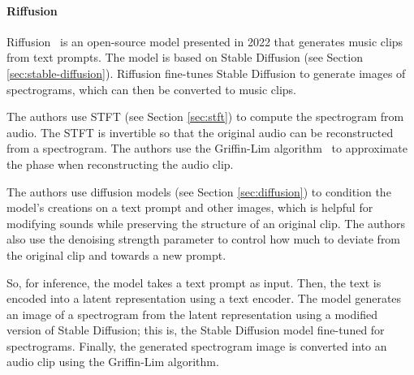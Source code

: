 \paragraph{Riffusion} \label{sec:riffusion}

Riffusion~\cite{forsgren_riffusion_2022} is an open-source model presented in 2022 that generates music clips from text prompts. The model is based on Stable Diffusion (see Section \ref{sec:stable-diffusion}). Riffusion fine-tunes Stable Diffusion to generate images of spectrograms, which can then be converted to music clips.

The authors use \ac{STFT} (see Section \ref{sec:stft}) to compute the spectrogram from audio. The \ac{STFT} is invertible so that the original audio can be reconstructed from a spectrogram. The authors use the Griffin-Lim algorithm~\cite{griffin_signal_1984} to approximate the phase when reconstructing the audio clip.

The authors use diffusion models (see Section \ref{sec:diffusion}) to condition the model's creations on a text prompt and other images, which is helpful for modifying sounds while preserving the structure of an original clip. The authors also use the denoising strength parameter to control how much to deviate from the original clip and towards a new prompt.

So, for inference, the model takes a text prompt as input. Then, the text is encoded into a latent representation using a text encoder. The model generates an image of a spectrogram from the latent representation using a modified version of Stable Diffusion; this is, the Stable Diffusion model fine-tuned for spectrograms. Finally, the generated spectrogram image is converted into an audio clip using the Griffin-Lim algorithm.
